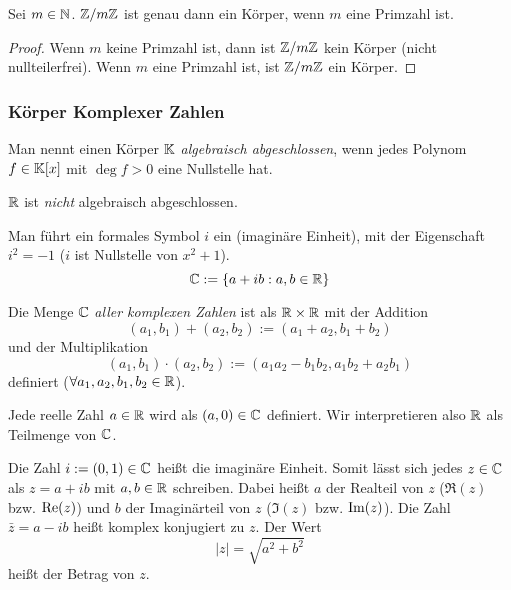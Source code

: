 \begin{thm}
	Sei $ m \in \mathbb N $. $ \mathbb Z/m\mathbb Z $ ist genau dann ein Körper, wenn $ m $ eine Primzahl ist.
\end{thm}
\begin{proof}
	Wenn $ m $ keine Primzahl ist, dann ist $ \mathbb Z/m\mathbb Z $ kein Körper (nicht nullteilerfrei). Wenn $ m $ eine Primzahl ist, ist $ \mathbb Z/m\mathbb Z $ ein Körper.
\end{proof}

\subsubsection{Körper Komplexer Zahlen}

Man nennt einen Körper $ \mathbb K $ \emph{algebraisch abgeschlossen}, wenn jedes Polynom $ f \in \mathbb K[x] $ mit $ \deg f > 0 $ eine Nullstelle hat.

\begin{bem}
	$ \mathbb R $ ist \emph{nicht} algebraisch abgeschlossen.
\end{bem}

\begin{bem}[Intuition zu $ \C $]
	Man führt ein formales Symbol $ i $ ein (imaginäre Einheit), mit der Eigenschaft $ i^2 = -1 $ ($ i $ ist Nullstelle von $ x^2+1 $).
	\begin{equation*}
		\mathbb C := \{ a+ib : a,b \in \mathbb R \}
	\end{equation*}
\end{bem}

\begin{bem}
	Die Menge $ \C $ \emph{aller komplexen Zahlen} ist als $ \mathbb R \times \mathbb R $ mit der Addition 
	\begin{equation*}
		(a_{1},b_{1})+(a_{2},b_{2}) := (a_{1} + a_{2}, b_{1} + b_{2} )
	\end{equation*} 
	und der Multiplikation
	\begin{equation*}
		(a_{1},b_{1})\cdot (a_{2},b_{2}) := (a_{1} a_{2} - b_{1} b_{2}, a_{1} b_{2} + a_{2} b_{1})
	\end{equation*}
	definiert ($ \forall a_1, a_2, b_1, b_2 \in \mathbb R $).
	
	Jede reelle Zahl $ a \in \mathbb R $ wird als $ (a,0) \in \mathbb C $ definiert. Wir interpretieren also $ \mathbb R $ als Teilmenge von $ \C $.
	
	Die Zahl $ i := (0,1) \in \mathbb C $ heißt die imaginäre Einheit. Somit lässt sich jedes $ z \in \mathbb C $ als $ z = a+ib $ mit $ a,b \in \mathbb R $ schreiben. Dabei heißt $ a $ der Realteil von $ z $ ($ \Re(z) $ bzw. $ \operatorname{Re}(z) $) und $ b $ der Imaginärteil von $ z $ ($ \Im(z) $ bzw. $ \operatorname{Im}(z) $). Die Zahl $ \bar{z} = a -ib $ heißt komplex konjugiert zu $ z $. Der Wert
	\begin{equation*}
		|z| = \sqrt{a^2+b^2}
	\end{equation*}
	heißt der Betrag von $ z $.
\end{bem}


